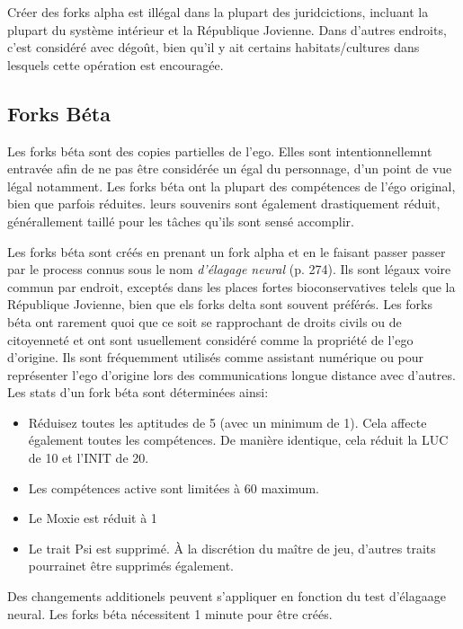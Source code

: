 Créer des forks alpha est illégal dans la plupart des juridcictions, incluant la plupart du système intérieur et la République Jovienne. Dans d'autres endroits, c'est considéré avec dégoût, bien qu'il y ait certains habitats/cultures dans lesquels cette opération est encouragée. 

\subsection{Forks Béta} 

Les forks béta sont des copies partielles de l'ego. Elles sont intentionnellemnt entravée afin de ne pas être considérée un égal du personnage, d'un point de vue légal notamment. Les forks béta ont la plupart des compétences de l'égo original, bien que parfois réduites. leurs souvenirs sont également drastiquement réduit, générallement taillé pour les tâches qu'ils sont sensé accomplir.

Les forks béta sont créés en prenant un fork alpha et en le faisant passer passer par le process connus sous le nom \textit{d'élagage neural} (p. 274). Ils sont légaux voire commun par endroit, exceptés dans les places fortes bioconservatives telels que la République Jovienne, bien que els forks delta sont souvent préférés. Les forks béta ont rarement quoi que ce soit se rapprochant de droits civils ou de citoyenneté et ont sont usuellement considéré comme la propriété de l'ego d'origine. Ils sont fréquemment utilisés comme assistant numérique ou pour représenter l'ego d'origine lors des communications longue distance avec d'autres. \\ Les stats d'un fork béta sont déterminées ainsi: 

\begin{itemize} \item Réduisez toutes les aptitudes de 5 (avec un minimum de 1). Cela affecte également toutes les compétences. De manière identique, cela réduit la LUC de 10 et l'INIT de 20. \item Les compétences active sont limitées à 60 maximum. \item Le Moxie est réduit à 1 \item Le trait Psi est supprimé. À la discrétion du maître de jeu, d'autres traits pourrainet être supprimés également. \end{itemize} 

Des changements additionels peuvent s'appliquer en fonction du test d'élagaage neural. Les forks béta nécessitent 1 minute pour être créés. 

